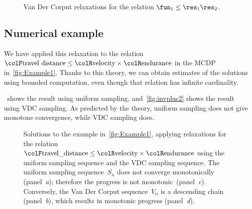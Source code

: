 \begin{figure}[h]
    \centering
    \caption{Van Der Corput relaxations for the relation
        $\fun_{1}\leq\res_{1}\res_{2}$.}
    \label{fig:approx_invmult}
\end{figure}

\subsection{Numerical example}

We have applied this relaxation to the relation ${\colF\text{travel distance}}\leq{\colR\text{velocity}}\times{\colR\text{endurance}}$ in the MCDP in~\cref{fig:Example1}.
Thanks to this theory, we can obtain estimates of the solutions using bounded computation, even though that relation has infinite cardinality.

~shows the result using uniform sampling,
and~\cref{fig:invplus2} shows the result using VDC sampling.
As predicted by the theory, uniform sampling does not give monotone
convergence, while VDC sampling does.
\begin{figure}[t]
    \centering
    \centering

    \caption{Solutions to the example in~\cref{fig:Example1}, applying relaxations
        for the relation ${\colF\text{travel\_distance}}\leq{\colR\text{velocity}}\times{\colR\text{endurance}}$
        using the uniform sampling sequence and the VDC sampling sequence.
        The uniform sampling sequence~$S_{n}$ does not converge monotonically
        (panel~\emph{a}); therefore the progress is not monotonic~(panel\emph{~c}).
        Conversely, the Van Der Corput sequence~$V_{n}$ is a descending
        chain (panel~\emph{b}), which results in monotonic progress (panel~\emph{d}).
    }
\end{figure}

